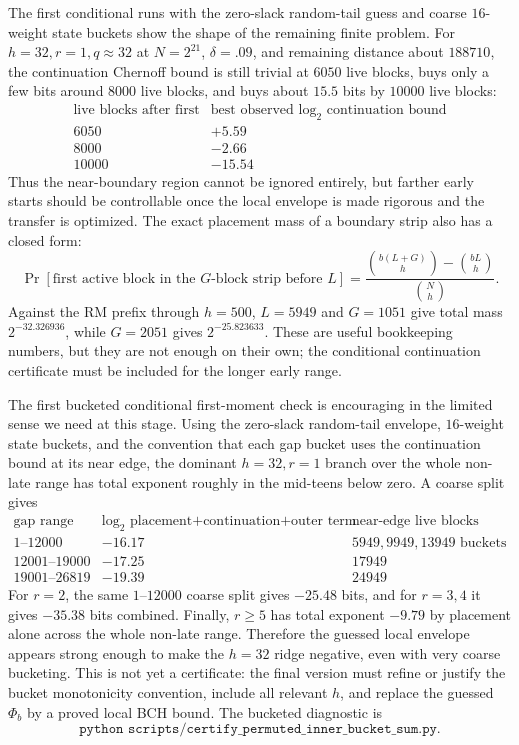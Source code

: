 The first conditional runs with the zero-slack random-tail guess and coarse \(16\)-weight state buckets show the shape
of the remaining finite problem.  For \(h=32,r=1,q\approx32\) at \(N=2^{21}\), \(\delta=.09\), and remaining distance
about \(188710\), the continuation Chernoff bound is still trivial at \(6050\) live blocks, buys only a few bits around
\(8000\) live blocks, and buys about \(15.5\) bits by \(10000\) live blocks:
\[
\begin{array}{c|c}
\text{live blocks after first} & \text{best observed }\log_2\text{ continuation bound}\\
\hline
6050 & +5.59\\
8000 & -2.66\\
10000 & -15.54
\end{array}
\]
Thus the near-boundary region cannot be ignored entirely, but farther early starts should be controllable once the
local envelope is made rigorous and the transfer is optimized.  The exact placement mass of a boundary strip also has a
closed form:
\[
\Pr[\text{first active block in the }G\text{-block strip before }L]
=
\frac{\binom{b(L+G)}{h}-\binom{bL}{h}}{\binom{N}{h}}.
\]
Against the RM prefix through \(h=500\), \(L=5949\) and \(G=1051\) give total mass \(2^{-32.326936}\), while
\(G=2051\) gives \(2^{-25.823633}\).  These are useful bookkeeping numbers, but they are not enough on their own; the
conditional continuation certificate must be included for the longer early range.

The first bucketed conditional first-moment check is encouraging in the limited sense we need at this stage.  Using the
zero-slack random-tail envelope, \(16\)-weight state buckets, and the convention that each gap bucket uses the
continuation bound at its near edge, the dominant \(h=32,r=1\) branch over the whole non-late range has total exponent
roughly in the mid-teens below zero.  A coarse split gives
\[
\begin{array}{c|c|c}
\text{gap range} & \log_2\text{ placement+continuation+outer term} & \text{near-edge live blocks}\\
\hline
1\text{--}12000 & -16.17 & 5949,9949,13949\text{ buckets}\\
12001\text{--}19000 & -17.25 & 17949\\
19001\text{--}26819 & -19.39 & 24949
\end{array}
\]
For \(r=2\), the same \(1\text{--}12000\) coarse split gives \(-25.48\) bits, and for \(r=3,4\) it gives
\(-35.38\) bits combined.  Finally, \(r\ge5\) has total exponent \(-9.79\) by placement alone across the whole
non-late range.  Therefore the guessed local envelope appears strong enough to make the \(h=32\) ridge negative, even
with very coarse bucketing.  This is not yet a certificate: the final version must refine or justify the bucket
monotonicity convention, include all relevant \(h\), and replace the guessed \(\Phi_b\) by a proved local BCH bound.
The bucketed diagnostic is
\[
\texttt{python scripts/certify\_permuted\_inner\_bucket\_sum.py}.
\]

